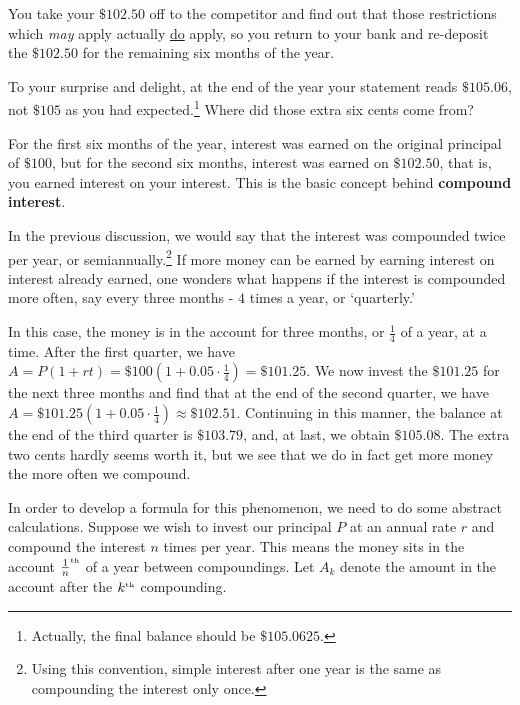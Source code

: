 \documentclass{ximera}
\begin{document}
\smallskip

You take your $\$102.50$ off to the competitor and find out that those restrictions which \textit{may} apply actually \underline{do} apply, so you return to your bank and re-deposit the $\$102.50$ for the remaining six months of the year. 

\smallskip 

To your surprise and delight, at the end of the year your statement reads $\$105.06$, not $\$105$ as you had expected.\footnote{Actually, the final balance should be $\$105.0625$.}  Where did those extra six cents come from?  

\smallskip

For the first six months of the year, interest was earned on the original principal of $\$100$, but for the second six months, interest was earned on $\$102.50$, that is, you earned interest on your interest.  This is the basic concept behind \textbf{compound interest}. 

\smallskip

In the previous discussion, we would say that the interest was compounded twice per year, or semiannually.\footnote{Using this convention, simple interest after one year is the same as compounding the interest only once.}  If more money can be earned by earning interest on interest already earned, one wonders what happens if the interest is compounded more often, say every three months -  $4$ times a year, or `quarterly.' 

\smallskip

In this case, the money is in the account for three months, or $\frac{1}{4}$ of a year, at a time.  After the first quarter, we have $A = P(1+rt) =  \$100 \left(1 + 0.05 \cdot \frac{1}{4} \right) = \$101.25$.  We now invest the $\$101.25$ for the next three months and find that at the end of the second quarter, we have $A =  \$101.25 \left(1 + 0.05 \cdot \frac{1}{4} \right)\approx \$102.51$.  Continuing in this manner, the balance at the end of the third quarter is $\$103.79$, and, at last, we obtain $\$105.08$.  The extra two cents hardly seems worth it, but we see that we do in fact get more money the more often we compound. 

\smallskip

In order to develop a formula for this phenomenon, we need to do some abstract calculations.  Suppose we wish to invest our principal $P$ at an annual rate $r$ and compound the interest $n$ times per year.  This means the money sits in the account $\frac{1}{n}^{\mbox{\tiny th}}$ of a year between compoundings.  Let $A_{k}$ denote the amount in the account after the $k^{\mbox{\tiny th}}$ compounding. 
\end{document}
